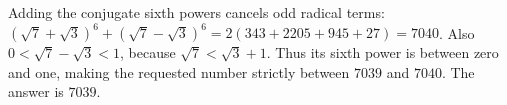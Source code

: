 Adding the conjugate sixth powers cancels odd radical terms: $(\sqrt7+\sqrt3)^6+(\sqrt7-\sqrt3)^6=2(343+2205+945+27)=7040$. Also $0<\sqrt7-\sqrt3<1$, because $\sqrt7<\sqrt3+1$. Thus its sixth power is between zero and one, making the requested number strictly between $7039$ and $7040$. The answer is $\boxed{7039}$.

